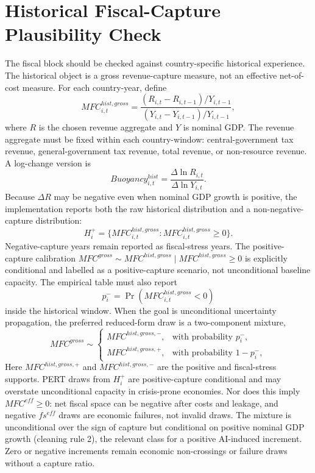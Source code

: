 \documentclass[11pt,a4paper]{article}
\begin{document}
\section{Historical Fiscal-Capture Plausibility Check}\label{sec:historical_plausibility}

The fiscal block should be checked against country-specific historical experience. The historical object is a gross revenue-capture measure, not an effective net-of-cost measure. For each country-year, define
\begin{equation}\label{eq:mfc_hist_gross_v10}
    MFC^{hist,gross}_{i,t}
    =\frac{(R_{i,t}-R_{i,t-1})/Y_{i,t-1}}{(Y_{i,t}-Y_{i,t-1})/Y_{i,t-1}},
\end{equation}
where $R$ is the chosen revenue aggregate and $Y$ is nominal GDP. The revenue aggregate must be fixed within each country-window: central-government tax revenue, general-government tax revenue, total revenue, or non-resource revenue. A log-change version is
\begin{equation}\label{eq:buoyancy_hist_v10}
    Buoyancy^{hist}_{i,t}=\frac{\Delta\ln R_{i,t}}{\Delta\ln Y_{i,t}}.
\end{equation}
Because $\Delta R$ may be negative even when nominal GDP growth is positive, the implementation reports both the raw historical distribution and a non-negative-capture distribution:
\begin{equation}\label{eq:mfc_hist_positive_v10}
    H_i^+=\{MFC^{hist,gross}_{i,t}:MFC^{hist,gross}_{i,t}\geq0\}.
\end{equation}
Negative-capture years remain reported as fiscal-stress years. The positive-capture calibration $MFC^{gross}\sim MFC^{hist,gross}\mid MFC^{hist,gross}\geq0$ is explicitly conditional and labelled as a positive-capture scenario, not unconditional baseline capacity.
The empirical table must also report
\begin{equation}
    p_i^- = \Pr\left(MFC^{hist,gross}_{i,t}<0\right)
\end{equation}
inside the historical window. When the goal is unconditional uncertainty propagation, the preferred reduced-form draw is a two-component mixture,
\begin{equation}
    MFC^{gross}\sim
    \begin{cases}
    MFC^{hist,gross,-}, & \text{with probability }p_i^-,\\
    MFC^{hist,gross,+}, & \text{with probability }1-p_i^- ,
    \end{cases}
\end{equation}
Here $MFC^{hist,gross,+}$ and $MFC^{hist,gross,-}$ are the positive and fiscal-stress supports. PERT draws from $H_i^+$ are positive-capture conditional and may overstate unconditional capacity in crisis-prone economies. Nor does this imply $MFC^{eff}\geq0$: net fiscal space can be negative after costs and leakage, and negative $fs^{eff}$ draws are economic failures, not invalid draws.
The mixture is unconditional over the sign of capture but conditional on positive nominal GDP growth (cleaning rule 2), the relevant class for a positive AI-induced increment. Zero or negative increments remain economic non-crossings or failure draws without a capture ratio.
\end{document}
